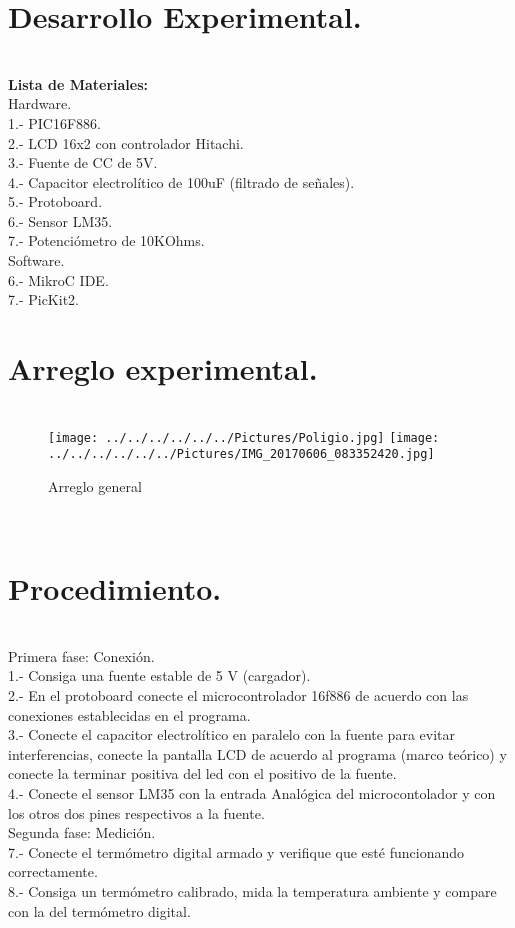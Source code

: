 \documentclass[10pt,a4paper]{article}
\begin{document}
\section*{Desarrollo Experimental.}\\
\textbf{Lista de Materiales:} \\
Hardware.\\
1.- PIC16F886.\\
2.- LCD 16x2 con controlador Hitachi.\\
3.- Fuente de CC de 5V.\\
4.- Capacitor electrol\'{i}tico de 100uF (filtrado de se\~{n}ales).\\
5.- Protoboard.\\
6.- Sensor LM35.\\
7.- Potenci\'{o}metro de 10KOhms.\\
Software.\\
6.- MikroC IDE.\\
7.- PicKit2.\\
\medskip
\section*{Arreglo experimental.}
\begin{figure}[hbtp]
\centering
\\
\texttt{[image: ../../../../../../Pictures/Poligio.jpg]} 
\texttt{[image: ../../../../../../Pictures/IMG\_20170606\_083352420.jpg]} 
\caption{Arreglo general}
\end{figure} 
\\

\section*{Procedimiento.}
\\
Primera fase: Conexi\'{o}n.\\
1.- Consiga una fuente estable de 5 V (cargador).\\
2.- En el protoboard conecte el microcontrolador 16f886 de acuerdo con las conexiones establecidas en el programa.\\
3.- Conecte el capacitor electrol\'{i}tico en paralelo con la fuente para evitar interferencias, conecte la pantalla LCD de acuerdo al programa (marco te\'{o}rico) y conecte la terminar positiva del led con el positivo de la fuente. \\
4.- Conecte el sensor LM35 con la entrada Anal\'{o}gica del microcontolador y con los otros dos pines respectivos a la fuente.\\
Segunda fase:  Medici\'{o}n.\\
7.- Conecte el term\'{o}metro digital armado y verifique que est\'{e} funcionando correctamente.\\
8.- Consiga un term\'{o}metro calibrado, mida la temperatura ambiente y compare con la del term\'{o}metro digital.\\
\medskip
\\
\end{document}
